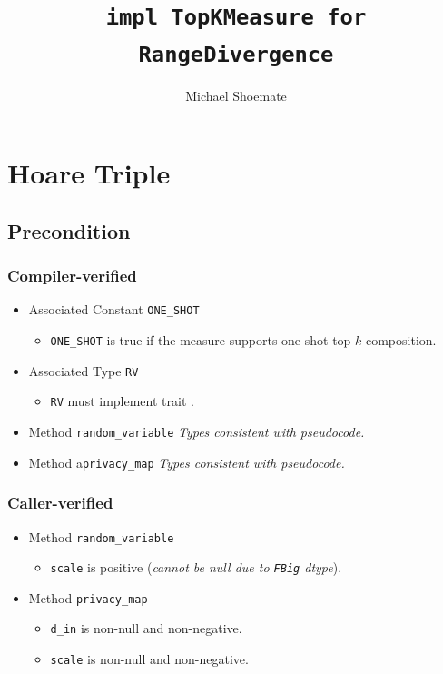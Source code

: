 \documentclass{article}
\title{\texttt{impl TopKMeasure for RangeDivergence}}
\author{Michael Shoemate}
\begin{document}
  
\maketitle 
 
\section{Hoare Triple} 
\subsection*{Precondition} 
\subsubsection*{Compiler-verified}
\begin{itemize}
    \item Associated Constant \texttt{ONE\_SHOT}
        \begin{itemize}
            \item \texttt{ONE\_SHOT} is true if the measure supports one-shot top-$k$ composition.
        \end{itemize}
    \item Associated Type \texttt{RV}
        \begin{itemize}
            \item \texttt{RV} must implement trait .
        \end{itemize}
    \item Method \texttt{random\_variable}
        \textit{Types consistent with pseudocode.}
    \item Method a\texttt{privacy\_map}
        \textit{Types consistent with pseudocode.}
\end{itemize}

\subsubsection*{Caller-verified}
\begin{itemize}
    \item Method \texttt{random\_variable}
        \begin{itemize}
            \item \texttt{scale} is positive (\textit{cannot be null due to \texttt{FBig} dtype}).
        \end{itemize}
    \item Method \texttt{privacy\_map}
        \begin{itemize}
            \item \texttt{d\_in} is non-null and non-negative.
            \item \texttt{scale} is non-null and non-negative.
        \end{itemize}
\end{itemize}
\end{document}
